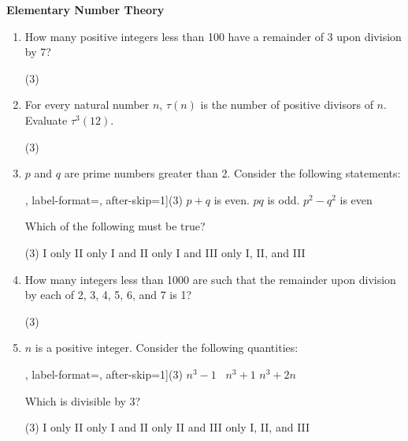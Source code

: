 \documentclass{amsart}
\begin{document}
	
	
	\begin{center}\Large{\textbf{Elementary Number Theory}}\end{center}\vskip0.25in
	\begin{enumerate}
		\item How many positive integers less than 100 have a remainder of 3 upon division by 7?
		\begin{tasks}(3)
		\end{tasks}
		
		\item For every natural number $n$, $\tau(n)$ is the number of positive divisors of $n$. Evaluate $\tau^{3}(12)$.
		\begin{tasks}(3)
			\task 1
			\task 2
			\task 3
			\task 4
			\task 6
		\end{tasks}
		
		\item $p$ and $q$ are prime numbers greater than 2. Consider the following statements:
		
		\begin{tasks}[counter-format = tsk[R], label-format=\normalfont, after-skip=1\medskipamount](3)
			\task $p + q$ is even.
			\task $pq$ is odd.
			\task $p^{2} - q^{2}$ is even
		\end{tasks}
		Which of the following must be true?
		\begin{tasks}(3)
			\task I only
			\task II only
			\task I and II only
			\task I and III only
			\task I, II, and III
		\end{tasks}
		
		\item How many integers less than 1000 are such that the remainder upon division by each of 2, 3, 4, 5, 6, and 7 is 1?
		\begin{tasks}(3)
			\task 0
		\end{tasks}
		
		\item $n$ is a positive integer. Consider the following quantities:
		\begin{tasks}[counter-format = tsk[R], label-format=\normalfont,  after-skip=1\medskipamount](3)
			\task $n^{3} - 1$ \
			\task $n^{3} + 1$
			\task $n^{3} + 2n$
		\end{tasks}
		Which is divisible by 3?
		\begin{tasks}(3)
			\task I only
			\task II only
			\task I and II only
			\task II and III only
			\task I, II, and III
		\end{tasks}
	\end{enumerate}
	
\end{document}
